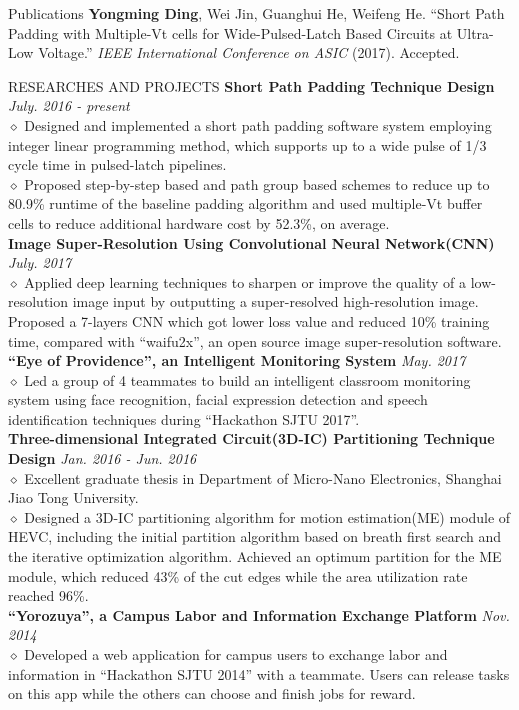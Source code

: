 \documentclass{resume} %
\begin{document}
\begin{rSection}{Publications}
\textbf{Yongming Ding}, Wei Jin, Guanghui He, Weifeng He. ``Short Path Padding with Multiple-Vt cells for Wide-Pulsed-Latch Based Circuits at Ultra-Low Voltage.'' \emph{IEEE International Conference on ASIC}  (2017). Accepted.
\end{rSection}

\begin{rSection}{RESEARCHES AND PROJECTS}
\textbf{Short Path Padding Technique Design} \hfill \emph{July. 2016 - present}
\\$\diamond$ Designed and implemented a short path padding software system employing integer linear programming method, which supports up to a wide pulse of 1/3 cycle time in pulsed-latch pipelines.
\\$\diamond$ Proposed step-by-step based and path group based schemes to reduce up to 80.9\% runtime of the baseline padding algorithm and used multiple-Vt buffer cells to reduce additional hardware cost by 52.3\%, on average. 
\\\textbf{Image Super-Resolution Using Convolutional Neural Network(CNN)} \hfill \emph{July. 2017}
\\$\diamond$  Applied deep learning techniques to sharpen or improve the quality of a low-resolution image input by outputting a super-resolved high-resolution image. Proposed a 7-layers CNN which got lower loss value and reduced 10\% training time, compared with ``waifu2x'', an open source image super-resolution software.
\\\textbf{``Eye of Providence'', an Intelligent Monitoring System} \hfill \emph{May. 2017}
\\$\diamond$ Led a group of 4 teammates to build an intelligent classroom monitoring system using face recognition, facial expression detection and speech identification techniques during ``Hackathon SJTU 2017''.
\\\textbf{Three-dimensional Integrated Circuit(3D-IC) Partitioning Technique Design} \hfill \emph{Jan. 2016 - Jun. 2016}
\\$\diamond$ Excellent graduate thesis in Department of Micro-Nano Electronics, Shanghai Jiao Tong University.
\\$\diamond$ Designed a 3D-IC partitioning algorithm for motion estimation(ME) module of HEVC, including the initial partition algorithm based on breath first search and the iterative optimization algorithm. Achieved an optimum partition for the ME module, which reduced 43\% of the cut edges while the area utilization rate reached 96\%.
\\\textbf{``Yorozuya'', a Campus Labor and Information Exchange Platform} \hfill \emph{Nov. 2014}
\\$\diamond$  Developed a web application for campus users to exchange labor and information in ``Hackathon SJTU 2014'' with a teammate. Users can release tasks on this app while the others can choose and finish jobs for reward.
\end{rSection}
\end{document}

